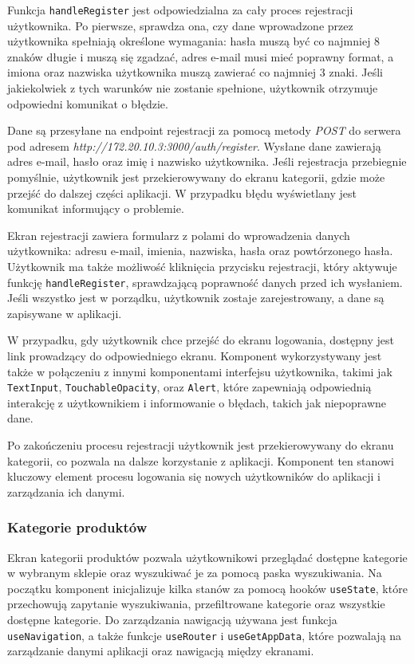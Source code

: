Funkcja \texttt{handleRegister} jest odpowiedzialna za cały proces rejestracji użytkownika. Po pierwsze, sprawdza ona, czy dane wprowadzone przez użytkownika spełniają określone wymagania: hasła muszą być co najmniej 8 znaków długie i muszą się zgadzać, adres e-mail musi mieć poprawny format, a imiona oraz nazwiska użytkownika muszą zawierać co najmniej 3 znaki. Jeśli jakiekolwiek z tych warunków nie zostanie spełnione, użytkownik otrzymuje odpowiedni komunikat o błędzie.

Dane są przesyłane na endpoint rejestracji za pomocą metody \textit{POST} do serwera pod adresem \textit{http://172.20.10.3:3000/auth/register}. Wysłane dane zawierają adres e-mail, hasło oraz imię i nazwisko użytkownika. Jeśli rejestracja przebiegnie pomyślnie, użytkownik jest przekierowywany do ekranu kategorii, gdzie może przejść do dalszej części aplikacji. W przypadku błędu wyświetlany jest komunikat informujący o problemie.

Ekran rejestracji zawiera formularz z polami do wprowadzenia danych użytkownika: adresu e-mail, imienia, nazwiska, hasła oraz powtórzonego hasła. Użytkownik ma także możliwość kliknięcia przycisku rejestracji, który aktywuje funkcję \texttt{handleRegister}, sprawdzającą poprawność danych przed ich wysłaniem. Jeśli wszystko jest w porządku, użytkownik zostaje zarejestrowany, a dane są zapisywane w aplikacji. 

W przypadku, gdy użytkownik chce przejść do ekranu logowania, dostępny jest link prowadzący do odpowiedniego ekranu. Komponent wykorzystywany jest także w połączeniu z innymi komponentami interfejsu użytkownika, takimi jak \texttt{TextInput}, \texttt{TouchableOpacity}, oraz \texttt{Alert}, które zapewniają odpowiednią interakcję z użytkownikiem i informowanie o błędach, takich jak niepoprawne dane.

Po zakończeniu procesu rejestracji użytkownik jest przekierowywany do ekranu kategorii, co pozwala na dalsze korzystanie z aplikacji. Komponent ten stanowi kluczowy element procesu logowania się nowych użytkowników do aplikacji i zarządzania ich danymi.

\subsubsection{Kategorie produktów}

Ekran kategorii produktów pozwala użytkownikowi przeglądać dostępne kategorie w wybranym sklepie oraz wyszukiwać je za pomocą paska wyszukiwania. Na początku komponent inicjalizuje kilka stanów za pomocą hooków \texttt{useState}, które przechowują zapytanie wyszukiwania, przefiltrowane kategorie oraz wszystkie dostępne kategorie. Do zarządzania nawigacją używana jest funkcja \texttt{useNavigation}, a także funkcje \texttt{useRouter} i \texttt{useGetAppData}, które pozwalają na zarządzanie danymi aplikacji oraz nawigacją między ekranami.

